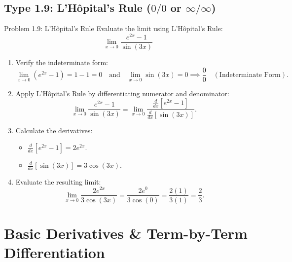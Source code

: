 \documentclass[11pt,a4paper]{article}
\begin{document}
\subsection{Type 1.9: L'H\^opital's Rule ($0/0$ or $\infty/\infty$)}
\begin{problembox}{Problem 1.9: L'H\^opital's Rule}
Evaluate the limit using L'H\^opital's Rule:
\[
\lim_{x \to 0} \frac{e^{2x} - 1}{\sin(3x)}
\]
\end{problembox}
\begin{solutionbox}
\begin{enumerate}
	\item [Step 1.] Verify the indeterminate form:
	\begin{equation*}
		\lim_{x \to 0} (e^{2x} - 1) = 1 - 1 = 0 \quad \text{and} \quad \lim_{x \to 0} \sin(3x) = 0 \implies \frac{0}{0} \quad (\text{Indeterminate Form}).
	\end{equation*}
	
	\item [Step 2.] Apply L'H\^opital's Rule by differentiating numerator and denominator:
	\begin{equation*}
		\lim_{x \to 0} \frac{e^{2x} - 1}{\sin(3x)} = \lim_{x \to 0} \frac{\frac{d}{dx}[e^{2x} - 1]}{\frac{d}{dx}[\sin(3x)]}.
	\end{equation*}

	\item [Step 3.] Calculate the derivatives:
	\begin{itemize}
		\item $\frac{d}{dx}[e^{2x} - 1] = 2e^{2x}$.
		\item $\frac{d}{dx}[\sin(3x)] = 3\cos(3x)$.
	\end{itemize}

	\item [Step 4.] Evaluate the resulting limit:
	\begin{equation*}
		\lim_{x \to 0} \frac{2e^{2x}}{3\cos(3x)} = \frac{2e^0}{3\cos(0)} = \frac{2(1)}{3(1)} = \frac{2}{3}.
	\end{equation*}
\end{enumerate}
\end{solutionbox}

\newpage
\section{Basic Derivatives \& Term-by-Term Differentiation}
\end{document}
